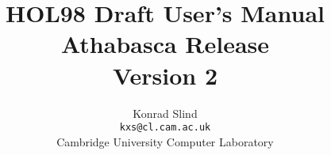 





\newcommand{\comment}[1]{}

\newcommand{\inbox}[1]	{\begin{center}
			 \framebox{\parbox{0.984\textwidth}{#1}}
			 \end{center}}

\newcommand{\ident}      {\mbox{\it ident}}
\newcommand{\tactic}      {\mbox{\it tactic}}
\newcommand{\dtype}      {\mbox{\it dtype}}
\newcommand{\clause}      {\mbox{\it clause}}
 \newcommand{\primtactic}      {\mbox{\it primtactic}}
 \newcommand{\numeral}    {\mbox{\it numeral}}
 \newcommand{\charseq}    {\mbox{\it charseq}}
 \newcommand{\vstr}       {\mbox{\it vstr}}
 \newcommand{\type}       {\mbox{\it hol\_type}}
 \renewcommand{\term}       {\mbox{\it term}}
 \newcommand{\bs}         {\mbox{$\backslash$}}
 \newcommand{\SUC}       {\mbox{\tt SUC}}
 \newcommand{\CONS}       {\mbox{\tt CONS}}
 \newcommand{\INSERT}    {\mbox{\tt INSERT}}
 \newcommand{\NOT}       {\mbox{\tt ~}}
 \newcommand{\AND}       {\mbox{\tt /\bs}}
 \newcommand{\OR}       {\mbox{\tt \bs/}}
 \newcommand{\IMP}       {\mbox{\tt ==>}}
 \newcommand{\LET}       {\mbox{\tt let}}
 \newcommand{\IN}       {\mbox{\tt in}}
 \newcommand{\und}       {\mbox{\tt and}}
 \newcommand{\ALL}       {\mbox{\tt !}}
 \newcommand{\EXISTS}       {\mbox{\tt ?}}
 \newcommand{\EXISTSONE}       {\mbox{\tt ?!}}
 \newcommand{\CHOOSE}       {\mbox{\tt @}}


 

 \title {HOL98 Draft User's Manual \\ Athabasca Release \\ Version 2}
 \author{Konrad Slind \\ {\tt kxs@cl.cam.ac.uk} \\
	 Cambridge University Computer Laboratory}
 \maketitle


